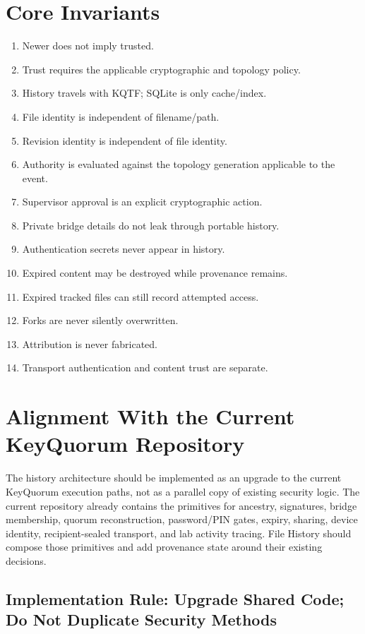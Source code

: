 \documentclass[11pt]{article}
\begin{document}
\section{Core Invariants}
\begin{enumerate}[leftmargin=1.8em]
  \item Newer does not imply trusted.
  \item Trust requires the applicable cryptographic and topology policy.
  \item History travels with KQTF; SQLite is only cache/index.
  \item File identity is independent of filename/path.
  \item Revision identity is independent of file identity.
  \item Authority is evaluated against the topology generation applicable to the event.
  \item Supervisor approval is an explicit cryptographic action.
  \item Private bridge details do not leak through portable history.
  \item Authentication secrets never appear in history.
  \item Expired content may be destroyed while provenance remains.
  \item Expired tracked files can still record attempted access.
  \item Forks are never silently overwritten.
  \item Attribution is never fabricated.
  \item Transport authentication and content trust are separate.
\end{enumerate}

\section{Alignment With the Current KeyQuorum Repository}

The history architecture should be implemented as an upgrade to the current KeyQuorum execution paths, not as a parallel copy of existing security logic. The current repository already contains the primitives for ancestry, signatures, bridge membership, quorum reconstruction, password/PIN gates, expiry, sharing, device identity, recipient-sealed transport, and lab activity tracing. File History should compose those primitives and add provenance state around their existing decisions.

\subsection{Implementation Rule: Upgrade Shared Code; Do Not Duplicate Security Methods}
\end{document}
